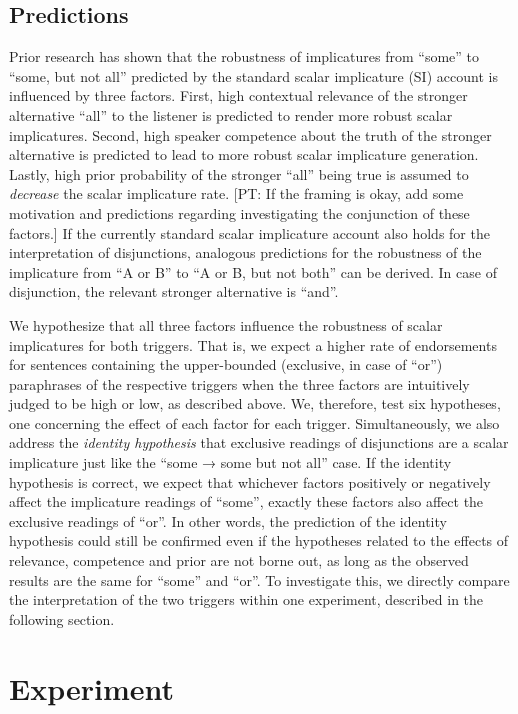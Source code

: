\documentclass{sp}
\newcommand{\pt}[1]{\textcolor{Cerulean}{[PT: #1]}}
\begin{document}
\subsection{Predictions}
Prior research has shown that the robustness of implicatures from ``some'' to ``some, but not all''  predicted by the standard scalar implicature (SI) account is influenced by three factors. First, high contextual relevance of the stronger alternative ``all'' to the listener is predicted to render more robust scalar implicatures. Second, high speaker competence about the truth of the stronger alternative is predicted to lead to more robust scalar implicature generation. Lastly, high prior probability of the stronger ``all'' being true is assumed to \textit{decrease} the scalar implicature rate. \pt{If the framing is okay, add some motivation and predictions regarding investigating the conjunction of these factors.}
If the currently standard scalar implicature account also holds for the interpretation of disjunctions, analogous predictions for the robustness of the implicature from ``A or B'' to ``A or B, but not both'' can be derived. In case of disjunction, the relevant stronger alternative is ``and''.

We hypothesize that all three factors influence the robustness of scalar implicatures for both triggers. That is, we expect a higher rate of endorsements for sentences containing the upper-bounded (exclusive, in case of ``or'') paraphrases of the respective triggers when the three factors are intuitively judged to be high or low, as described above. We, therefore, test six hypotheses, one concerning the effect of each factor for each trigger. 
Simultaneously,  we also address the \textit{identity hypothesis} that exclusive readings of disjunctions are a scalar implicature just like the ``some → some but not all'' case. If the identity hypothesis is correct, we expect that whichever factors positively or negatively affect the implicature readings of ``some'', exactly these factors also affect the exclusive readings of ``or''. In other words, the prediction of the identity hypothesis could still be confirmed even if the hypotheses related to the effects of relevance, competence and prior are not borne out, as long as the observed results are the same for ``some'' and ``or''. To investigate this, we directly compare the interpretation of the two triggers within one experiment, described in the following section.

\section{Experiment}
\end{document}
